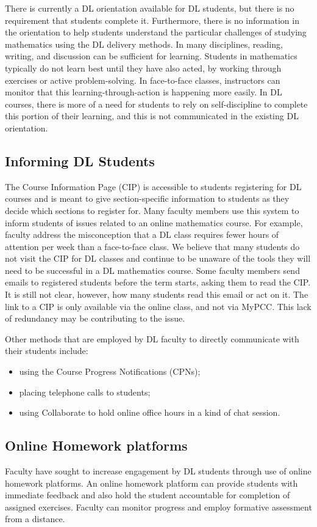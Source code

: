 There is currently a DL orientation available for DL students, but there is no requirement that students complete it. Furthermore, there is no information in the orientation to help students understand the particular challenges of studying mathematics using the DL delivery methods.  In many disciplines, reading, writing, and discussion can be sufficient for learning. Students in mathematics typically do not learn best until they have also acted, by working through exercises or active problem-solving. In face-to-face classes, instructors can monitor that this learning-through-action is happening more easily. In DL courses, there is more of a need for students to rely on self-discipline to complete this portion of their learning, and this is not communicated in the existing DL orientation.


\subsection{Informing DL Students}
The Course Information Page (CIP) is accessible to students registering for DL courses and is meant to give section-specific information to students as they decide which sections to register for.   Many faculty members use this system to inform students of issues related to an online mathematics course.  For example, faculty address the misconception that a DL class requires fewer hours of attention per week than a face-to-face class. We believe that many students do not visit the CIP for DL classes and continue to be unaware of the tools they will need to be successful in a DL mathematics course.   Some faculty members send emails to registered students before the term starts, asking them to read the CIP.  It is still not clear, however, how many students read this email or act on it.  The link to a CIP is only available via the online class, and not via MyPCC. This lack of redundancy may be contributing to the issue.

Other methods that are employed by DL faculty to directly communicate with their students include:
\begin{itemize}
\item using the Course Progress Notifications (CPNs);
\item placing telephone calls to students;
\item using Collaborate to hold online office hours in a kind of chat session.
\end{itemize}

\subsection{Online Homework platforms}
Faculty have sought to increase engagement by DL students through use of online homework platforms. An online homework platform can provide students with immediate feedback and also hold the student accountable for completion of assigned exercises. Faculty can monitor progress and employ formative assessment from a distance.

